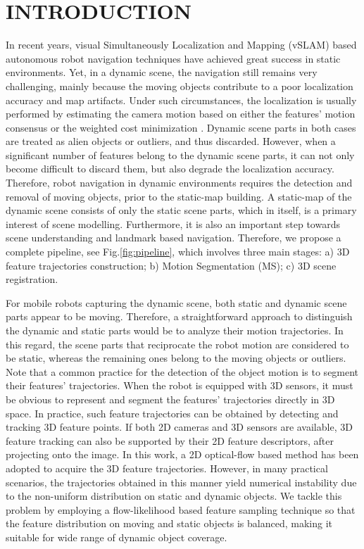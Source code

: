 \documentclass[10pt,twocolumn,letterpaper]{article}  %
\begin{document}
\section{INTRODUCTION}
In recent years, visual Simultaneously Localization and Mapping (vSLAM) based autonomous robot navigation techniques have achieved great success in static environments. Yet, in a dynamic scene, the navigation still remains very challenging, mainly because the moving objects contribute to a poor localization accuracy and map artifacts. Under such circumstances, the localization is usually performed by estimating the camera motion based on either the features’ motion consensus \cite{c_1} or the weighted cost minimization \cite{c_2}. Dynamic scene parts in both cases are treated as alien objects or outliers, and thus discarded. However, when a significant number of features belong to the dynamic scene parts, it can not only become difficult to discard them, but also degrade the localization accuracy\cite{c0}. Therefore, robot navigation in dynamic environments requires the detection and removal of moving objects, prior to the static-map building. A static-map of the dynamic scene consists of only the static scene parts, which in itself, is a primary interest of scene modelling. Furthermore, it is also an important step towards scene understanding and landmark based navigation. Therefore, we propose a complete pipeline, see Fig.\ref{fig:pipeline}, which involves three main stages: a) 3D feature trajectories construction; b) Motion Segmentation (MS); c) 3D scene registration.

For mobile robots capturing the dynamic scene, both static and dynamic scene parts appear to be moving. Therefore, a straightforward approach to distinguish the dynamic and static parts would be to analyze their motion trajectories. In this regard, the scene parts that reciprocate the robot motion are considered to be static, whereas the remaining ones belong to the moving objects or outliers. Note that a common practice for the detection of the object motion is to segment their features' trajectories. When the robot is equipped with 3D sensors, it must be obvious to represent and segment the features' trajectories directly in 3D space. In practice, such feature trajectories can be obtained by detecting and tracking 3D feature points. If both 2D cameras and 3D sensors are available, 3D feature tracking can also be supported by their 2D feature descriptors, after projecting onto the image. In this work, a 2D optical-flow based method has been adopted to acquire the 3D feature trajectories. However, in many practical scenarios, the trajectories obtained in this manner yield numerical instability due to the non-uniform distribution on static and dynamic objects. We tackle this problem by employing a flow-likelihood based feature sampling technique so that the feature distribution on moving and static objects is balanced, making it suitable for wide range of dynamic object coverage.
\end{document}
